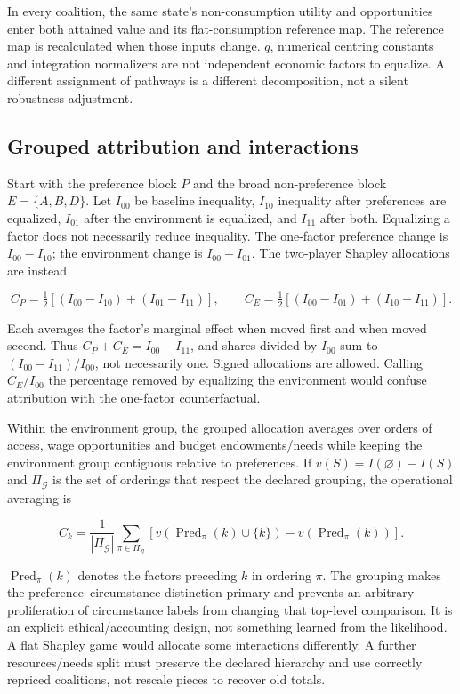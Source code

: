 \documentclass[11pt,a4paper]{article}
\begin{document}
In every coalition, the same state's non-consumption utility and opportunities enter both attained value and its flat-consumption reference map. The reference map is recalculated when those inputs change. \(q\), numerical centring constants and integration normalizers are not independent economic factors to equalize. A different assignment of pathways is a different decomposition, not a silent robustness adjustment.

\subsection{Grouped attribution and interactions}\label{grouped-attribution-and-interactions}

Start with the preference block \(P\) and the broad non-preference block \(E=\{A,B,D\}\). Let \(I_{00}\) be baseline inequality, \(I_{10}\) inequality after preferences are equalized, \(I_{01}\) after the environment is equalized, and \(I_{11}\) after both. Equalizing a factor does not necessarily reduce inequality. The one-factor preference change is \(I_{00}-I_{10}\); the environment change is \(I_{00}-I_{01}\). The two-player Shapley allocations are instead

\[C_P=\tfrac12[(I_{00}-I_{10})+(I_{01}-I_{11})],\qquad
C_E=\tfrac12[(I_{00}-I_{01})+(I_{10}-I_{11})].\]

Each averages the factor's marginal effect when moved first and when moved second. Thus \(C_P+C_E=I_{00}-I_{11}\), and shares divided by \(I_{00}\) sum to \((I_{00}-I_{11})/I_{00}\), not necessarily one. Signed allocations are allowed. Calling \(C_E/I_{00}\) the percentage removed by equalizing the environment would confuse attribution with the one-factor counterfactual.

Within the environment group, the grouped allocation averages over orders of access, wage opportunities and budget endowments/needs while keeping the environment group contiguous relative to preferences. If \(v(S)=I(\varnothing)-I(S)\) and \(\Pi_{\mathcal G}\) is the set of orderings that respect the declared grouping, the operational averaging is

\[C_k=\frac{1}{|\Pi_{\mathcal G}|}\sum_{\pi\in\Pi_{\mathcal G}}
\left[v(\operatorname{Pred}_\pi(k)\cup\{k\})-v(\operatorname{Pred}_\pi(k))\right].\]

\(\operatorname{Pred}_\pi(k)\) denotes the factors preceding \(k\) in ordering \(\pi\). The grouping makes the preference--circumstance distinction primary and prevents an arbitrary proliferation of circumstance labels from changing that top-level comparison. It is an explicit ethical/accounting design, not something learned from the likelihood. A flat Shapley game would allocate some interactions differently. A further resources/needs split must preserve the declared hierarchy and use correctly repriced coalitions, not rescale pieces to recover old totals.
\end{document}
